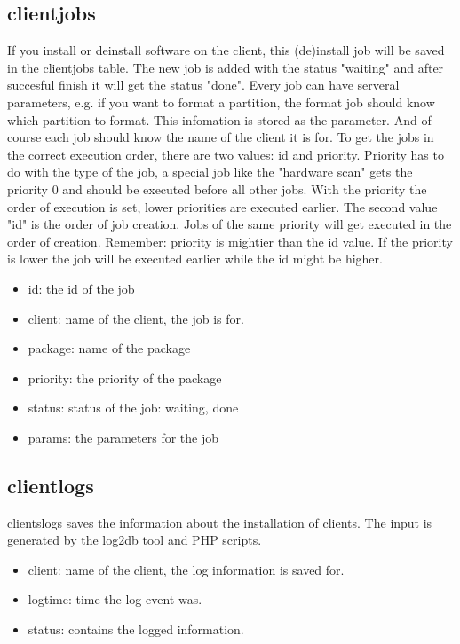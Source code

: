 \subsection{clientjobs}
If you install or deinstall software on the client, this (de)install job will be saved in the clientjobs table. The new job is added with the status "waiting" and after succesful finish it will get the status "done". Every job can have serveral parameters, e.g. if you want to format a partition, the format job should know which partition to format. This infomation is stored as the parameter. And of course each job should know the name of the client it is for. To get the jobs in the correct execution order, there are two values: id and priority. Priority has to do with the type of the job, a special job like the "hardware scan" gets the priority 0 and should be executed before all other jobs. With the priority the order of execution is set, lower priorities are executed earlier. The second value "id" is the order of job creation. Jobs of the same priority will get executed in the order of creation. Remember: priority is mightier than the id value. If the priority is lower the job will be executed earlier while the id might be higher.
\begin{itemize}
\item id: the id of the job
\item client: name of the client, the job is for.
\item package: name of the package
\item priority: the priority of the package
\item status: status of the job: waiting, done
\item params: the parameters for the job
\end{itemize}

\subsection{clientlogs}
clientslogs saves the information about the installation of clients. The input is generated by the log2db tool and PHP scripts.
\begin{itemize}
\item client: name of the client, the log information is saved for.
\item logtime: time the log event was.
\item status: contains the logged information.
\end{itemize}

